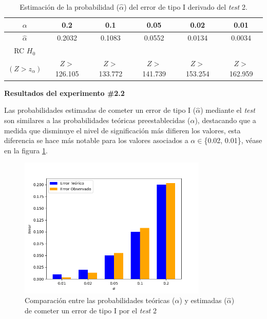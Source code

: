 \documentclass[12pt]{report}
\begin{document}
\begin{table}[h!]
	\centering
		\caption{Estimación de la probabilidad ($\hat{\alpha}$) del error de tipo I derivado del \textit{test} 2.}
	\begin{tabular}{|c|ccccc|}
		\hline
		$\alpha$ &  0.2 & 0.1 & 0.05 & 0.02 &  0.01 \\
		\hline
		$\hat{\alpha}$ & 0.2032 & 0.1083 & 0.0552 & 0.0134 & 0.0034 \\
		\hline
		RC $H_0$  &		&				&			&			&\\
		$(Z>z_\alpha)$&$Z>$126.105& $Z>$133.772& $Z>$141.739& $Z>$153.254& $Z>$162.959 \\
		\hline
	\end{tabular}

	\label{tab:error1-prob1}
\end{table}

\textbf{Resultados del experimento \#2.2}

Las probabilidades estimadas de cometer un error de tipo I ($\hat{\alpha}$) mediante el \textit{test} son similares a las probabilidades teóricas preestablecidas ($\alpha$), destacando que a medida que disminuye el nivel de significación más difieren los valores, esta diferencia se hace más notable para los valores asociados a $\alpha \in$\{0.02, 0.01\}, véase en la figura \ref{Teorico vs Observado1}.
\begin{figure}[ht]
	\centering
	
	\includegraphics[width=0.8\textwidth]{4td_teo_obs.png}
	\caption{Comparación entre las probabilidades teóricas ($\alpha$) y estimadas ($\hat{\alpha}$) de cometer un error de tipo I por el \textit{test} 2}
	\label{Teorico vs Observado1}
\end{figure}\\
\end{document}
